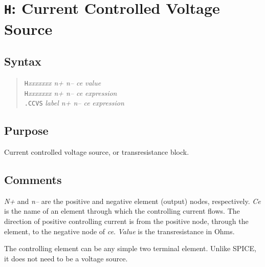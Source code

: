 %
%
%
%
\section{{\tt H}: Current Controlled Voltage Source}
\subsection{Syntax}
\begin{verse}
{\tt H}{\it xxxxxxx n+ n-- ce} {\it value}\\
{\tt H}{\it xxxxxxx n+ n-- ce} {\it expression}\\
{\tt .CCVS} {\it label n+ n-- ce} {\it expression}
\end{verse}
\subsection{Purpose}

Current controlled voltage source, or transresistance block.
\subsection{Comments}

{\it N+} and {\it n--} are the positive and negative element (output)
nodes, respectively.  {\it Ce} is the name of an element through
which the controlling current flows.  The direction of positive
controlling current is from the positive node, through the element,
to the negative node of {\it ce}.  {\it Value} is the transresistance
in Ohms.

The controlling element can be any simple two terminal element.
Unlike SPICE, it does not need to be a voltage source.
